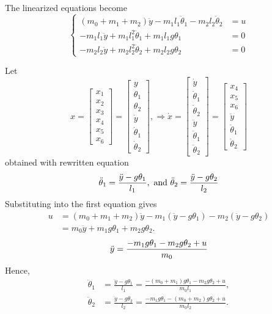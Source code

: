 \documentclass[12pt,a4paper]{article}
\begin{document}
The linearized equations become
\[
\begin{cases}
	(m_0 + m_1 + m_2)\ddot y - m_1l_1\ddot \theta_1 - m_2l_2\ddot \theta_2 &= u \\
	-m_1l_1\ddot y + m_1l_1^2\ddot \theta_1 + m_1l_1g\theta_1&= 0 \\
	-m_2l_2\ddot y + m_2l_2^2\ddot \theta_2  +m_2l_2g\theta_2&= 0
\end{cases}
\]

Let 
\[
x = \begin{bmatrix}
	x_1 \\ x_2 \\ x_3 \\ x_4 \\ x_5 \\ x_6
\end{bmatrix} = \begin{bmatrix}
	y \\ \theta_1 \\ \theta_2 \\ \dot y \\ \dot \theta_1 \\ \dot \theta_2
\end{bmatrix}, \Rightarrow \dot x = \begin{bmatrix}
	\dot y \\ \dot \theta_1 \\ \dot \theta_2 \\ \ddot y \\ \ddot \theta_1 \\ \ddot \theta_2
\end{bmatrix} = \begin{bmatrix}
x_4 \\ x_5 \\ x_6 \\ \ddot y \\ \ddot \theta_1 \\ \ddot \theta_2
\end{bmatrix}
\]
obtained with rewritten equation
\[
\ddot \theta_1 = { \ddot y - g\theta_1  \over l_1 }, \text{ and } \ddot \theta_2 = { \ddot y - g\theta_2 \over l_2}
\]
Substituting into the first equation gives
\begin{align*}
 u &= (m_0+m_1+m_2)\ddot y
      -m_1(\ddot y-g\theta_1)-m_2(\ddot y-g\theta_2) \\
   &=m_0\ddot y+m_1g\theta_1+m_2g\theta_2.
\end{align*}
\[
\ddot y = { -m_1g\theta_1 - m_2g\theta_2 + u \over m_0} 
\]
Hence,
\begin{align*}
\ddot\theta_1
 &=\frac{\ddot y-g\theta_1}{l_1}
 =\frac{-(m_0+m_1)g\theta_1-m_2g\theta_2+u}{m_0l_1},\\
\ddot\theta_2
 &=\frac{\ddot y-g\theta_2}{l_2}
 =\frac{-m_1g\theta_1-(m_0+m_2)g\theta_2+u}{m_0l_2}.
\end{align*}
\end{document}
